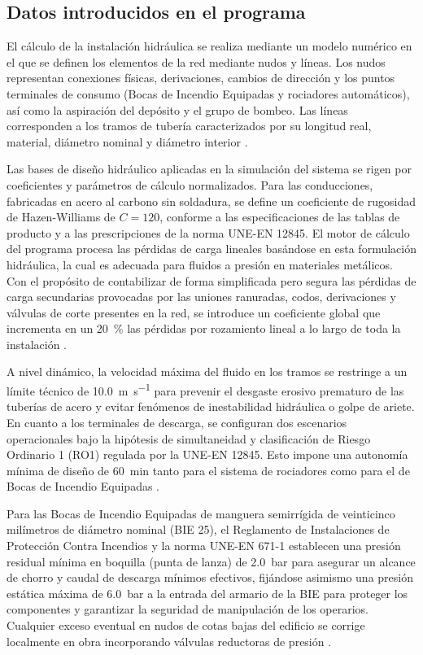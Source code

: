 \documentclass[12pt,a4paper]{article}
\begin{document}
\subsection{Datos introducidos en el programa}

El cálculo de la instalación hidráulica se realiza mediante un modelo numérico en el que se definen los elementos de la red mediante nudos y líneas. Los nudos representan conexiones físicas, derivaciones, cambios de dirección y los puntos terminales de consumo (Bocas de Incendio Equipadas y rociadores automáticos), así como la aspiración del depósito y el grupo de bombeo. Las líneas corresponden a los tramos de tubería caracterizados por su longitud real, material, diámetro nominal y diámetro interior \parencite{UNE_EN_12845}. 

Las bases de diseño hidráulico aplicadas en la simulación del sistema se rigen por coeficientes y parámetros de cálculo normalizados. Para las conducciones, fabricadas en acero al carbono sin soldadura, se define un coeficiente de rugosidad de Hazen-Williams de $C = 120$, conforme a las especificaciones de las tablas de producto y a las prescripciones de la norma UNE-EN 12845. El motor de cálculo del programa procesa las pérdidas de carga lineales basándose en esta formulación hidráulica, la cual es adecuada para fluidos a presión en materiales metálicos. Con el propósito de contabilizar de forma simplificada pero segura las pérdidas de carga secundarias provocadas por las uniones ranuradas, codos, derivaciones y válvulas de corte presentes en la red, se introduce un coeficiente global que incrementa en un \SI{20}{\percent} las pérdidas por rozamiento lineal a lo largo de toda la instalación \parencite{UNE_EN_12845}. 

A nivel dinámico, la velocidad máxima del fluido en los tramos se restringe a un límite técnico de \SI{10.0}{\meter\per\second} para prevenir el desgaste erosivo prematuro de las tuberías de acero y evitar fenómenos de inestabilidad hidráulica o golpe de ariete. En cuanto a los terminales de descarga, se configuran dos escenarios operacionales bajo la hipótesis de simultaneidad y clasificación de Riesgo Ordinario 1 (RO1) regulada por la UNE-EN 12845. Esto impone una autonomía mínima de diseño de \SI{60}{\minute} tanto para el sistema de rociadores como para el de Bocas de Incendio Equipadas \parencite{RIPCI_GUIA_2022,UNE_EN_12845}. 

Para las Bocas de Incendio Equipadas de manguera semirrígida de veinticinco milímetros de diámetro nominal (BIE 25), el Reglamento de Instalaciones de Protección Contra Incendios y la norma UNE-EN 671-1 establecen una presión residual mínima en boquilla (punta de lanza) de \SI{2.0}{\bar} para asegurar un alcance de chorro y caudal de descarga mínimos efectivos, fijándose asimismo una presión estática máxima de \SI{6.0}{\bar} a la entrada del armario de la BIE para proteger los componentes y garantizar la seguridad de manipulación de los operarios. Cualquier exceso eventual en nudos de cotas bajas del edificio se corrige localmente en obra incorporando válvulas reductoras de presión \parencite{RIPCI_GUIA_2022,UNE_EN_671_1}. 
\end{document}
